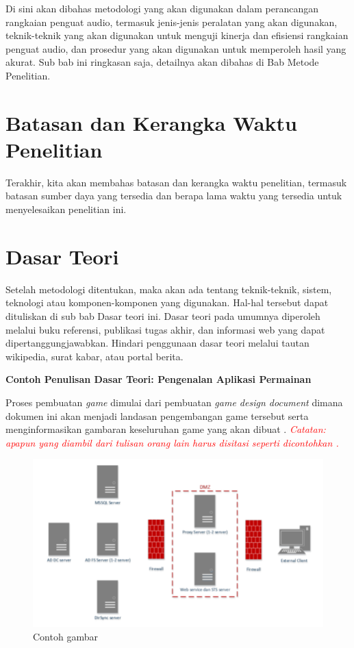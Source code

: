 Di sini akan dibahas metodologi yang akan digunakan dalam perancangan rangkaian penguat audio, termasuk jenis-jenis peralatan yang akan digunakan, teknik-teknik yang akan 
digunakan untuk menguji kinerja dan efisiensi rangkaian penguat audio, dan prosedur yang akan digunakan untuk memperoleh hasil yang akurat. Sub bab ini ringkasan saja, detailnya akan dibahas di Bab Metode Penelitian.

\section{Batasan dan Kerangka Waktu Penelitian}

Terakhir, kita akan membahas batasan dan kerangka waktu penelitian, termasuk batasan sumber daya yang tersedia dan berapa lama waktu yang tersedia untuk menyelesaikan 
penelitian ini.

\section{Dasar Teori}

Setelah metodologi ditentukan, maka akan ada tentang teknik-teknik, sistem, teknologi atau komponen-komponen yang digunakan. Hal-hal tersebut dapat dituliskan di sub bab Dasar 
teori ini. Dasar teori pada umumnya diperoleh melalui buku referensi, publikasi tugas akhir, dan informasi web yang dapat dipertanggungjawabkan. Hindari penggunaan dasar teori 
melalui tautan wikipedia, surat kabar, atau portal berita.

\vspace{1cm}

\noindent\textbf{Contoh Penulisan Dasar Teori: Pengenalan Aplikasi Permainan}

Proses pembuatan \textit{game} dimulai dari pembuatan \textit{game design document} dimana 
dokumen ini akan menjadi landasan pengembangan game tersebut serta menginformasikan gambaran keseluruhan game yang akan dibuat \cite{ferdiana2012agile}. \textcolor{red}{\textit{Catatan: apapun yang diambil dari tulisan orang lain harus disitasi seperti dicontohkan \cite{ferdiana2012agile}.}}

\begin{figure}[h]
	\centering
	\includegraphics[width=12cm]{contents/chapter-2/gambar-buatan-sendiri.png}
	\caption{Contoh gambar}
	\label{Fig:gambar-buatan-sendiri}
\end{figure}

